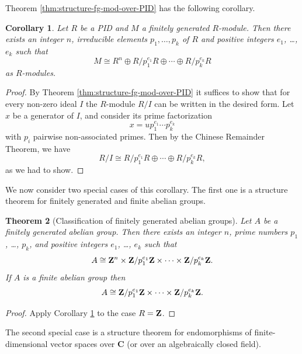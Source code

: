 \documentclass[11pt]{amsbook}
\def\bC{{\mathbf{C}}} \def\bP{{\mathbf{P}}} \def\bA{{\mathbf{A}}}
\theoremstyle{plain}
\newtheorem{theorem}{Theorem}
\newtheorem{corollary}[theorem]{Corollary}
\theoremstyle{definition}
\begin{document}
Theorem \ref{thm:structure-fg-mod-over-PID} has the following corollary.

\begin{corollary}\label{cor:structure-fg-mod-over-PID}
Let $R$ be a PID and $M$  a finitely generated $R$-module. Then there exists an integer $n$, irreducible elements $p_1,\ldots,p_k$ of $R$ and positive integers $e_1$, \ldots, $e_k$ such that
\[
	M \cong R^n \oplus R/p_1^{e_1}R \oplus \cdots \oplus R/p_k^{e_k}R
\]
as $R$-modules.
\end{corollary}

\begin{proof}
By Theorem \ref{thm:structure-fg-mod-over-PID} it suffices to show that for every non-zero ideal $I$  the $R$-module $R/I$ can be written in the desired form. Let $x$ be a generator of $I$, and consider its prime factorization
\[	
	x = u p_1^{e_1} \cdots p_k^{e_k}
\]
with $p_i$ pairwise non-associated primes. Then by the Chinese Remainder Theorem, we have
\[
	R/I \cong R/p_1^{e_1}R \oplus \cdots \oplus R/p_k^{e_k}R,
\]
as we had to show.
\end{proof}

We now consider two special cases of this corollary. The first one is a structure theorem for finitely generated and finite abelian groups.

\begin{theorem}[Classification of finitely generated abelian groups]
Let $A$ be a finitely generated abelian group. Then there exists an integer $n$, prime numbers 
$p_1$, \ldots, $p_k$, and positive integers $e_1$, \ldots, $e_k$ such that 
\[
	A \cong {\mathbf{Z}}^{n} \times {\mathbf{Z}}/{p_1^{e_1}}{\mathbf{Z}} \times \cdots \times {\mathbf{Z}}/{p_k^{e_k}}{\mathbf{Z}}.
\]
If $A$ is a finite abelian group then 
\[
	A \cong {\mathbf{Z}}/{p_1^{e_1}}{\mathbf{Z}} \times \cdots \times {\mathbf{Z}}/{p_k^{e_k}}{\mathbf{Z}}.
\]
\end{theorem}

\begin{proof}
Apply Corollary \ref{cor:structure-fg-mod-over-PID} to the case $R={\mathbf{Z}}$.
\end{proof}

The second special case is a structure theorem for endomorphisms of finite-dimensional vector spaces over $\bC$ (or over an algebraically closed field). 
\end{document}
